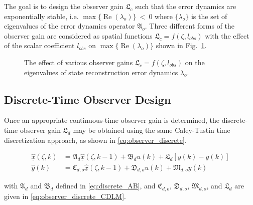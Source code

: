The goal is to design the observer gain $\mathfrak{L}_c$ such that the error dynamics are exponentially stable, i.e. $\max\{\operatorname{Re}(\lambda_{o})\}~<~0$ where $\{\lambda_{o}\}$ is the set of eigenvalues of the error dynamics operator $\mathfrak{A}_o$. Three different forms of the observer gain are considered as spatial functions $\mathfrak{L}_c = f(\zeta, l_{obs})$ with the effect of the scalar coefficient $l_{obs}$ on $\max\{\operatorname{Re}(\lambda_{o})\}$ shown in Fig.~\ref{fig:L_vs_lambda}.

\begin{figure}[!htbp]
    \centering
    
    \caption{The effect of various observer gains $\mathfrak{L}_c = f(\zeta, l_{obs})$ on the eigenvalues of state reconstruction error dynamics $\lambda_o$.}
    \label{fig:L_vs_lambda}
\end{figure}


\subsection{Discrete-Time Observer Design}

Once an appropriate continuous-time observer gain is determined, the discrete-time observer gain $\mathfrak{L}_d$ may be obtained using the same Caley-Tustin time discretization approach, as shown in \eqref{eq:observer_discrete}.

\begin{equation} \label{eq:observer_discrete}
    \begin{aligned}
        \underline{\hat{x}}(\zeta, k) &= \mathfrak{A}_d \underline{\hat{x}}(\zeta, k-1) + \mathfrak{B}_d u(k) + \mathfrak{L}_d [y(k) - \hat{y}(k)] \\
        \hat{y}(k) &= \mathfrak{C}_{d,o} \underline{\hat{x}}(\zeta, k-1) + \mathfrak{D}_{d,o} u(k) + \mathfrak{M}_{d,o} y(k)
    \end{aligned}
\end{equation}

with $\mathfrak{A}_d$ and $\mathfrak{B}_d$ defined in \eqref{eq:discrete_AB}, and $\mathfrak{C}_{d,o}$, $\mathfrak{D}_{d,o}$, $\mathfrak{M}_{d,o}$, and $\mathfrak{L}_d$ are given in \eqref{eq:observer_discrete_CDLM}.

